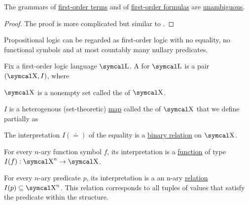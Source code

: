 \begin{proposition}\label{thm:first_order_terms_and_formulas_are_unambiguous}
  The grammars of \hyperref[def:first_order_syntax/term]{first-order terms} and of \hyperref[def:first_order_syntax/formula]{first-order formulas} are \hyperref[def:grammar_derivation/ambiguity]{unambiguous}.
\end{proposition}
\begin{proof}
  The proof is more complicated but similar to .
\end{proof}

\begin{remark}\label{rem:propositional_logic_as_first_order_logic}
  Propositional logic can be regarded as first-order logic with no equality, no functional symbols and at most countably many nullary predicates.
\end{remark}

\begin{definition}\label{def:first_order_structure}
  Fix a first-order logic language \( \CL \). A  for \( \CL \) is a pair \( (\CX, I) \), where

  \begin{DefEnum}
     \( \CX \) is a nonempty set called the  of \( \CX \).

     \( I \) is a heterogenous (set-theoretic) \hyperref[def:function]{map} called the  of \( \CX \) that we define partially as
    \begin{DefEnum}
       The interpretation \( I(\doteq) \) of the equality is a \hyperref[def:binary_relation]{binary relation} on \( \CX \).

       For every \( n \)-ary function symbol \( f \), its interpretation is a \hyperref[def:function]{function} of type \( I(f): \CX^n \to \CX \).

       For every \( n \)-ary predicate \( p \), its interpretation is a an n-ary \hyperref[def:relation]{relation} \( I(p) \subseteq \CX^n \). This relation corresponds to all tuples of values that satisfy the predicate within the structure.
    \end{DefEnum}
  \end{DefEnum}
\end{definition}

